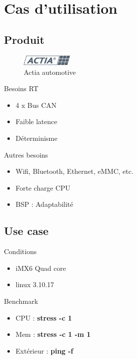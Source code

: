 \section{Cas d'utilisation}
\subsection{Produit}
\begin{frame}
	\begin{center}
		\begin{figure}
			\includegraphics[width=2.5cm]{img/logo-actia.png}
			\caption{Actia automotive}
		\end{figure}
	\end{center}


	\begin{block}{Besoins RT}
		\begin{itemize}
			\item 4 x Bus CAN
			\item Faible latence
			\item Déterminisme
		\end{itemize}
	\end{block}
	\begin{block}{Autres besoins}
		\begin{itemize}
			\item Wifi, Bluetooth, Ethernet, eMMC, etc.
			\item Forte charge CPU
			\item BSP : Adaptabilité
		\end{itemize}
	\end{block}
\end{frame}
\subsection{Use case}
\begin{frame}
	\begin{block}{Conditions}
		\begin{itemize}
			\item iMX6 Quad core
			\item linux 3.10.17
		\end{itemize}
	\end{block}
	\begin{block}{Benchmark}
		\begin{itemize}
		\item CPU : \textbf{stress -c 1}
		\item Mem : \textbf{stress -c 1 -m 1}
		\item Extérieur : \textbf{ping -f}
		\end{itemize}
	\end{block}
\end{frame}

